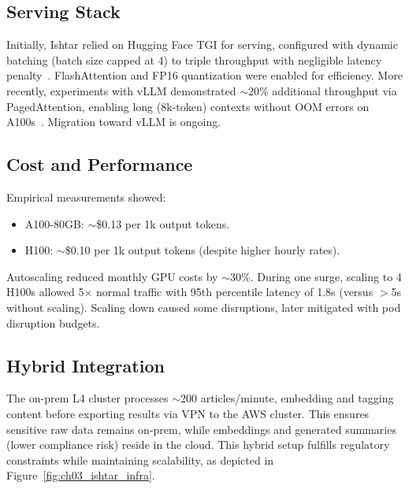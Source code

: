 \subsection{Serving Stack}
Initially, Ishtar relied on Hugging Face TGI for serving, configured with dynamic batching (batch size capped at 4) to triple throughput with negligible latency penalty~\cite{tgi-github,tgi_docs}. FlashAttention and FP16 quantization were enabled for efficiency. More recently, experiments with vLLM demonstrated $\sim$20\% additional throughput via PagedAttention, enabling long (8k-token) contexts without OOM errors on A100s~\cite{vllm-pagedattention,pagedattention_paper}. Migration toward vLLM is ongoing.

\subsection{Cost and Performance}
Empirical measurements showed:
\begin{itemize}
  \item A100-80GB: $\sim$\$0.13 per 1k output tokens.
  \item H100: $\sim$\$0.10 per 1k output tokens (despite higher hourly rates).
\end{itemize}
Autoscaling reduced monthly GPU costs by $\sim$30\%. During one surge, scaling to 4 H100s allowed 5$\times$ normal traffic with 95th percentile latency of 1.8s (versus $>$5s without scaling). Scaling down caused some disruptions, later mitigated with pod disruption budgets.

\subsection{Hybrid Integration}
The on-prem L4 cluster processes $\sim$200 articles/minute, embedding and tagging content before exporting results via VPN to the AWS cluster. This ensures sensitive raw data remains on-prem, while embeddings and generated summaries (lower compliance risk) reside in the cloud. This hybrid setup fulfills regulatory constraints while maintaining scalability, as depicted in Figure~\ref{fig:ch03_ishtar_infra}.

